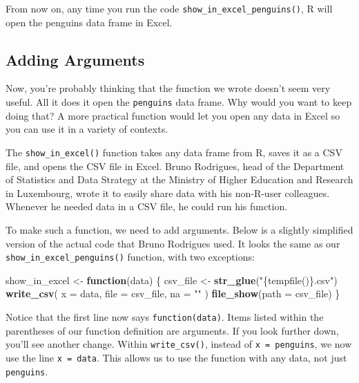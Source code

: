 \documentclass[
]{book}
\newenvironment{Shaded}{\begin{snugshade}}{\end{snugshade}}
\newcommand{\AttributeTok}[1]{\textcolor[rgb]{0.13,0.29,0.53}{#1}}
\newcommand{\ControlFlowTok}[1]{\textcolor[rgb]{0.13,0.29,0.53}{\textbf{#1}}}
\newcommand{\FunctionTok}[1]{\textcolor[rgb]{0.13,0.29,0.53}{\textbf{#1}}}
\newcommand{\NormalTok}[1]{#1}
\newcommand{\OtherTok}[1]{\textcolor[rgb]{0.56,0.35,0.01}{#1}}
\newcommand{\StringTok}[1]{\textcolor[rgb]{0.31,0.60,0.02}{#1}}
\begin{document}
From now on, any time you run the code \texttt{show\_in\_excel\_penguins()}, R will open the penguins data frame in Excel.

\hypertarget{adding-arguments}{%
\subsection*{Adding Arguments}\label{adding-arguments}}

Now, you're probably thinking that the function we wrote doesn't seem very useful. All it does it open the \texttt{penguins} data frame. Why would you want to keep doing that? A more practical function would let you open any data in Excel so you can use it in a variety of contexts.

The \texttt{show\_in\_excel()} function takes any data frame from R, saves it as a CSV file, and opens the CSV file in Excel. Bruno Rodrigues, head of the Department of Statistics and Data Strategy at the Ministry of Higher Education and Research in Luxembourg, wrote it to easily share data with his non-R-user colleagues. Whenever he needed data in a CSV file, he could run his function.

To make such a function, we need to add arguments. Below is a slightly simplified version of the actual code that Bruno Rodrigues used. It looks the same as our \texttt{show\_in\_excel\_penguins()} function, with two exceptions:

\begin{Shaded}
\begin{Highlighting}[]
\NormalTok{show\_in\_excel }\OtherTok{\textless{}{-}} \ControlFlowTok{function}\NormalTok{(data) \{}
\NormalTok{  csv\_file }\OtherTok{\textless{}{-}} \FunctionTok{str\_glue}\NormalTok{(}\StringTok{"\{tempfile()\}.csv"}\NormalTok{)}
  \FunctionTok{write\_csv}\NormalTok{(}
    \AttributeTok{x =}\NormalTok{ data,}
    \AttributeTok{file =}\NormalTok{ csv\_file,}
    \AttributeTok{na =} \StringTok{""}
\NormalTok{  )}
  \FunctionTok{file\_show}\NormalTok{(}\AttributeTok{path =}\NormalTok{ csv\_file)}
\NormalTok{\}}
\end{Highlighting}
\end{Shaded}

Notice that the first line now says \texttt{function(data)}. Items listed within the parentheses of our function definition are arguments. If you look further down, you'll see another change. Within \texttt{write\_csv()}, instead of \texttt{x\ =\ penguins}, we now use the line \texttt{x\ =\ data}. This allows us to use the function with any data, not just \texttt{penguins}.
\end{document}
